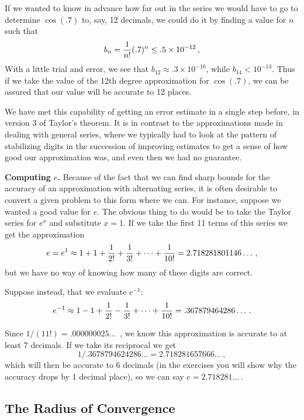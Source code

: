 {{{{If we wanted to know in advance 
how far out in the series we would have to go to determine $\cos(.7)$ to, say, 12 decimals, we could do it by finding a value for $n$ such that
\[
b_n={1 \over n!}(.7)^n \leq .5 \times 10^{-12}\, ,
\]
With a little trial and error, we see that $b_{12} \approx .3 \times
10^{-10}$, while \mbox{$b_{14} < 10^{-13}$}.  Thus if we take the value of the 12th degree approximation for $\cos(.7)$, we can be assured that our value will be accurate to 12 places.

We have met this capability of getting an error estimate in a single
step before, in version 3 of Taylor's theorem.  It is in contrast to the
approximations made in dealing with general series, where we typically
had to look at the pattern of stabilizing digits in the succession of
improving estimates to get a sense of how good our approximation was,
and even then we had no guarantee.

\medskip



{\bf Computing $e$.}  Because of the fact that we
 can find sharp bounds for the accuracy  of an approximation with alternating series, it is often desirable to convert a given problem to this form where we can.  For instance, suppose we wanted a good value for $e$.  The obvious thing to do would be to take the Taylor series for $e^x$ and substitute $x=1$.  If we take the first 11 terms of this series we get the approximation
\[
e=e^1\approx 1+1+{1 \over 2!} + {1 \over 3!} + \cdots + {1 \over 10!}=2.718281801146\ldots \, ,
\]
but we have no way of knowing how many of these digits are correct.

Suppose instead, that we evaluate $e^{-1}$:
\[
e^{-1}\approx 1-1+{1 \over 2!} - {1 \over 3!} + \cdots + {1 \over 10!}=.367879464286\ldots \, .
\]

Since $1/(11!) = .000000025\ldots \,$ , we know this approximation is accurate to at least 7 decimals.  If we take its reciprocal we get 
\[
1/.3678794624286\ldots = 2.718281657666\ldots \, ,
\]
which will then be accurate to 6 decimals (in the exercises you will show why the accuracy drops by 1 decimal place), so we can say $e=2.718281\ldots \,$.




\subsection{The Radius of Convergence}

}}}}
